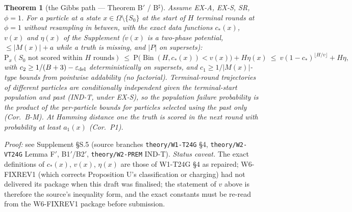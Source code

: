 \documentclass[11pt]{article}
\newtheorem{thmpart}{Theorem}[theorem]
\theoremstyle{definition}
\theoremstyle{remark}
\renewcommand{\Pr}{\mathrm{P}}
\newcommand{\Sz}{S_0}
\DeclareMathOperator{\Bin}{Bin}
\begin{document}
\begin{thmpart}[the Gibbs path --- Theorem B$'$ / B$^\sharp$]\label{thm:B}
Assume EX-A, EX-S, SR, $\phi=1$. For a particle at a state $x\in\Omega\setminus\{\Sz\}$ at the start of $H$ terminal rounds at $\phi=1$
without resampling in between, with the exact data functions $c_*(x)$, $v(x)$ and $\eta(x)$ of the Supplement ($v(x)$ is a two-phase potential,
$\le|M(x)|+a$ while a truth is missing, and $|P|$ on supersets):
\[
\Pr_x(\Sz\text{ not scored within }H\text{ rounds})\ \le\ \Pr\big(\Bin(H,c_*(x))<v(x)\big)+H\eta(x)\ \le\ v(1-c_*)^{\lfloor H/v\rfloor}+H\eta,
\]
with $c_2\ge1/(B+3)-\varepsilon_{\rm del}$ deterministically on supersets, and $c_1\ge1/|M(x)|$-type bounds from pointwise addability (no factorial).
Terminal-round trajectories of different particles are conditionally independent given the terminal-start population and past (IND-T, under EX-S), so the
population failure probability is the product of the per-particle bounds for particles selected using the past only (Cor.\ B-M). At Hamming distance one
the truth is scored in the next round with probability at least $a_1(x)$ (Cor.\ P1).
\end{thmpart}
\noindent\emph{Proof:} see Supplement \S S.5 (source branches \texttt{theory/W1-T24G} \S4, \texttt{theory/W2-VT24G} Lemma F$'$, B1$'$/B2$'$, \texttt{theory/W2-PREM} IND-T).
\emph{Status caveat.} The exact definitions of $c_*(x)$, $v(x)$, $\eta(x)$ are those of W1-T24G \S4 as repaired; W6-FIXREV1 (which corrects Proposition U's
classification or charging) had not delivered its package when this draft was finalised; the statement of $v$ above is therefore the source's inequality form, and the exact constants must be re-read
from the W6-FIXREV1 package before submission.
\end{document}
